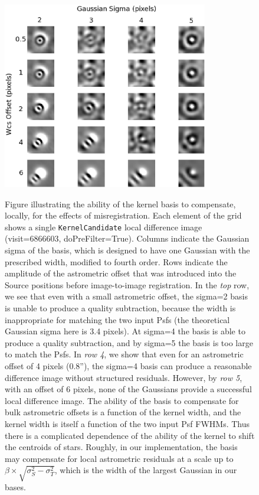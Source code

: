 \documentclass[prd, nofootinbib, floatfix, 11pt,tightenlines,times]{article}
\begin{document}
\begin{figure}
\includegraphics[width=0.8\textwidth]{figures/shift.eps} \\
\caption{Figure illustrating the ability of the kernel basis to
  compensate, locally, for the effects of misregistration.  Each
  element of the grid shows a single {\tt KernelCandidate} local
  difference image (visit=6866603, doPreFilter=True).  Columns
  indicate the Gaussian sigma of the basis, which is designed to have
  one Gaussian with the prescribed width, modified to fourth order.
  Rows indicate the amplitude of the astrometric offset that was
  introduced into the Source positions before image-to-image
  registration.  In the {\it top} row, we see that even with a small
  astrometric offset, the sigma=2 basis is unable to produce a quality
  subtraction, because the width is inappropriate for matching the two
  input Psfs (the theoretical Gaussian sigma here is 3.4 pixels).  At
  sigma=4 the basis is able to produce a quality subtraction, and by
  sigma=5 the basis is too large to match the Psfs.  In {\it row 4},
  we show that even for an astrometric offset of 4 pixels (0.8''), the
  sigma=4 basis can produce a reasonable difference image without
  structured residuals.  However, by {\it row 5}, with an offset of 6
  pixels, none of the Gaussians provide a successful local difference
  image.  The ability of the basis to compensate for bulk astrometric
  offsets is a function of the kernel width, and the kernel width is
  itself a function of the two input Psf FWHMs.  Thus there is a
  complicated dependence of the ability of the kernel to shift the
  centroids of stars.  Roughly, in our implementation, the basis may
  compensate for local astrometric residuals at a scale up to $\beta
  \times \sqrt{\sigma_S^2 - \sigma_T^2}$, which is the width of the
  largest Gaussian in our bases.}
\label{kernel_offsets}
\end{figure}
\end{document}
